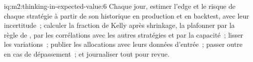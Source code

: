 \begin{solution}{iq:m2:thinking-in-expected-value:6}
Chaque jour, estimer l'edge et le risque de chaque stratégie à partir de son historique en production et en backtest, avec
leur incertitude~; calculer la fraction de Kelly après shrinkage, la plafonner par la règle de , par
les corrélations avec les autres stratégies et par la capacité~; lisser les variations~; publier les
allocations avec leurs données d'entrée~; passer outre en cas de dépassement~; et journaliser tout pour revue.
\end{solution}
